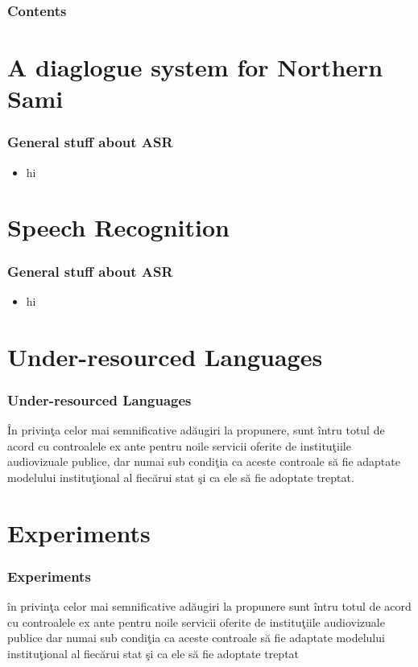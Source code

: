 \begin{frame}
\frametitle{Contents}
\tableofcontents
\end{frame}



\section{A diaglogue system for Northern Sami}
\begin{frame}
\frametitle{General stuff about ASR}
\begin{itemize}
\item hi
\end{itemize}
\end{frame}


\section{Speech Recognition}
\begin{frame}
\frametitle{General stuff about ASR}
\begin{itemize}
\item hi
\end{itemize}
\end{frame}

\section{Under-resourced Languages}
\begin{frame}
\frametitle{Under-resourced Languages}
În privinţa celor mai semnificative adăugiri la propunere, sunt întru totul de acord cu controalele ex ante pentru noile servicii oferite de instituţiile audiovizuale publice, dar numai sub condiţia ca aceste controale să fie adaptate modelului instituţional al fiecărui stat şi ca ele să fie adoptate treptat.

\end{frame}
%

\section{Experiments}
\begin{frame}
\frametitle{Experiments}
în privinţa celor mai semnificative adăugiri la propunere sunt întru totul de acord cu controalele ex ante pentru noile servicii oferite de instituţiile audiovizuale publice dar numai sub condiţia ca aceste controale să fie adaptate modelului instituţional al fiecărui stat şi ca ele să fie adoptate treptat 
\end{frame}




